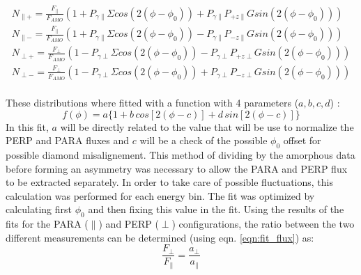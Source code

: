 \begin{eqnarray}
N_{\parallel +} = \frac{F_{\parallel}}{F_{AMO}} \left( 1 + P_{\gamma \parallel}\Sigma cos(2(\phi-\phi_0)) + P_{\gamma \parallel} P_{+z\parallel} G sin(2(\phi-\phi_0)) \right) \label{eq:N1}\\
N_{\parallel -} = \frac{F_{\parallel}}{F_{AMO}} \left( 1 + P_{\gamma \parallel}\Sigma cos(2(\phi-\phi_0)) - P_{\gamma \parallel} P_{-z\parallel} G sin(2(\phi-\phi_0)) \right) \label{eq:N2}\\
N_{\perp +} = \frac{F_{\perp}}{F_{AMO}} \left( 1 - P_{\gamma \perp}\Sigma cos(2(\phi-\phi_0)) - P_{\gamma \perp} P_{+z\perp} G sin(2(\phi-\phi_0)) \right) \label{eq:N3}\\
N_{\perp -} = \frac{F_{\perp}}{F_{AMO}} \left( 1 - P_{\gamma \perp}\Sigma cos(2(\phi-\phi_0)) + P_{\gamma \perp} P_{-z\perp} G sin(2(\phi-\phi_0)) \right) \label{eq:N4}\\
\end{eqnarray}


These distributions where fitted with a function with 4 parameters ($ a,b,c,d $) :
\begin{equation} \label{eqn:fit_flux}
f(\phi) = a \{ 1 + b\, cos[2 (\phi - c) ]  + d\, sin[2(\phi - c)] \} 
\end{equation}
In this fit, $a$ will be directly related to the value that will be use to normalize the PERP and PARA fluxes and $c$ will be a check of the possible $\phi_0$ offset for possible diamond misalignement.
This method of dividing by the amorphous data before forming an asymmetry was necessary to allow the PARA and PERP flux to be extracted separately. In order to take care of possible fluctuations, this calculation was performed for each energy bin. The fit was optimized by calculating first $\phi_0$ and then fixing this value in the fit. 
Using the results of the fits for the PARA ($\parallel$) and PERP ($\perp$) configurations, the ratio between the two different measurements can be determined (using eqn. \ref{eqn:fit_flux}) as:
\begin{equation}
\frac{F_{\perp}}{F_{\parallel}} = \frac{a_{\perp}}{a_{\parallel}}
\end{equation}

